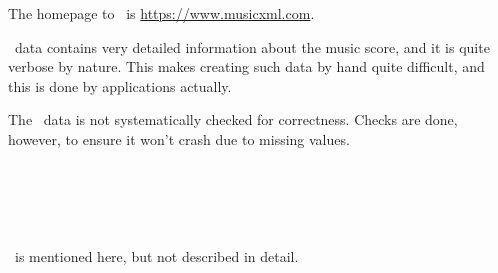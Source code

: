 The homepage to \mxml\ is \url{https://www.musicxml.com}.

\mxml\ data contains very detailed information about the music score, and it is quite verbose by nature. This makes creating such data by hand quite difficult, and this is done by applications actually.

The \mxml\ data is not systematically checked for correctness. Checks are done, however, to ensure it won't crash due to missing values.


\section{\xmlToBrl\ }

\xmlToBrl\ is mentioned here, but not described in detail.


\section{\xmlToXml\ }


\section{\xmlToGmn\ }


\section{\msdlconverter}%


